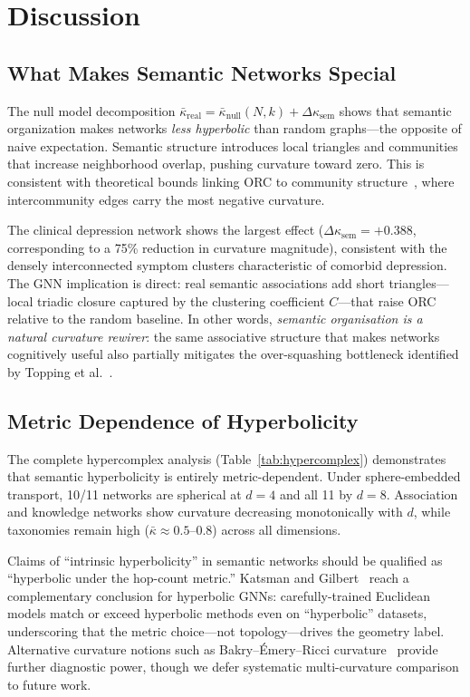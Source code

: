 \documentclass[11pt,a4paper]{article}
\newcommand{\kbar}{\bar{\kappa}}
\newcommand{\Dksem}{\Delta\kappa_{\text{sem}}}
\begin{document}
\section{Discussion}
\label{sec:discussion}

\subsection{What Makes Semantic Networks Special}

The null model decomposition $\kbar_{\mathrm{real}} = \kbar_{\mathrm{null}}(N,k) + \Dksem$ shows that semantic organization makes networks \emph{less hyperbolic} than random graphs---the opposite of naive expectation. Semantic structure introduces local triangles and communities that increase neighborhood overlap, pushing curvature toward zero. This is consistent with theoretical bounds linking ORC to community structure~\cite{community2024orc}, where intercommunity edges carry the most negative curvature.

The clinical depression network shows the largest effect ($\Dksem = +0.388$, corresponding to a 75\% reduction in curvature magnitude), consistent with the densely interconnected symptom clusters characteristic of comorbid depression. The GNN implication is direct: real semantic associations add short triangles---local triadic closure captured by the clustering coefficient $C$---that raise ORC relative to the random baseline. In other words, \emph{semantic organisation is a natural curvature rewirer}: the same associative structure that makes networks cognitively useful also partially mitigates the over-squashing bottleneck identified by Topping et al.~\cite{topping2022over}.

\subsection{Metric Dependence of Hyperbolicity}

The complete hypercomplex analysis (Table~\ref{tab:hypercomplex}) demonstrates that semantic hyperbolicity is entirely metric-dependent. Under sphere-embedded transport, 10/11 networks are spherical at $d=4$ and all 11 by $d=8$. Association and knowledge networks show curvature decreasing monotonically with $d$, while taxonomies remain high ($\kbar \approx 0.5$--$0.8$) across all dimensions.

Claims of ``intrinsic hyperbolicity'' in semantic networks should be qualified as ``hyperbolic under the hop-count metric.'' Katsman and Gilbert~\cite{katsman2025microscope} reach a complementary conclusion for hyperbolic GNNs: carefully-trained Euclidean models match or exceed hyperbolic methods even on ``hyperbolic'' datasets, underscoring that the metric choice---not topology---drives the geometry label. Alternative curvature notions such as Bakry--\'Emery--Ricci curvature~\cite{bakryemery2024} provide further diagnostic power, though we defer systematic multi-curvature comparison to future work.
\end{document}
